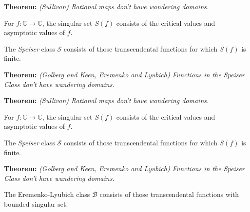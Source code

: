 \documentclass{beamer}
\begin{document}
\begin{frame}

{\bf Theorem:} {\it (Sullivan) Rational maps don't have wandering domains.}

\vspace{2.5mm} 

For $f: \mathbb{C} \rightarrow \mathbb{C}$, the singular set $S(f)$ consists of the critical values and asymptotic values of $f$.

\vspace{2.5mm}

The {\it Speiser} class $\mathcal{S}$ consists of those transcendental functions for which $S(f)$ is finite. 

\vspace{2.5mm} 

{\bf Theorem:} {\it (Golberg and Keen, Eremenko and Lyubich)  Functions in the Speiser Class don't have wandering domains.}

\end{frame}






\begin{frame}

{\bf Theorem:} {\it (Sullivan) Rational maps don't have wandering domains.}

\vspace{2.5mm} 

For $f: \mathbb{C} \rightarrow \mathbb{C}$, the singular set $S(f)$ consists of the critical values and asymptotic values of $f$.

\vspace{2.5mm}

The {\it Speiser} class $\mathcal{S}$ consists of those transcendental functions for which $S(f)$ is finite. 

\vspace{2.5mm} 

{\bf Theorem:} {\it (Golberg and Keen, Eremenko and Lyubich)  Functions in the Speiser Class don't have wandering domains.}

\vspace{2.5mm}

The Eremenko-Lyubich class $\mathcal{B}$ consists of those transcendental functions with bounded singular set. 

\end{frame}
\end{document}
